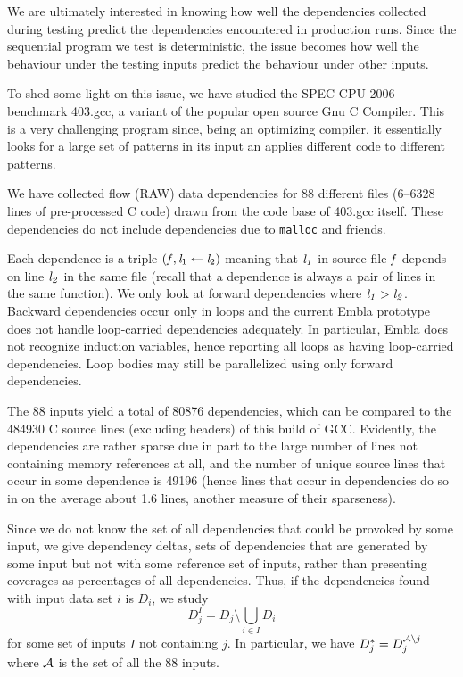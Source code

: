 \documentclass[times, 10pt,twocolumn]{article}
\begin{document}
We are ultimately interested in knowing how well the dependencies
collected during testing predict the dependencies encountered in
production runs.  Since the sequential program we test is
deterministic, the issue becomes how well the behaviour under the
testing inputs predict the behaviour under other inputs.

To shed some light on this issue, we have studied the SPEC CPU 2006
benchmark 403.gcc, a variant of the popular open source Gnu C
Compiler. This is a very challenging program since, being an
optimizing compiler, it essentially looks for a large set of patterns
in its input an applies different code to different patterns.

We have collected flow (RAW) data dependencies for 88 different files
(6--6328 lines of pre-processed C code) drawn from the code base of
403.gcc itself. These dependencies do not include dependencies due to
{\tt malloc} and friends.

Each dependence is a triple $({\it f}, {\it l}_1 \leftarrow {\it l}_2)$
meaning that $\it l_1$ in source file $\it f$ depends on line
$\it l_2$ in the same file (recall that a dependence is always a
pair of lines in the same function). We only look at forward dependencies where $\it l_1 >
l_2$. Backward dependencies occur only in loops and the current
Embla prototype does not handle loop-carried dependencies adequately.
In particular, Embla does not recognize induction variables, hence
reporting all loops as having loop-carried dependencies. Loop bodies 
may still be parallelized using only forward dependencies.

The 88 inputs yield a total of 80876 dependencies, which
can be compared to the 484930 C source lines (excluding headers) of
this build of GCC. Evidently, the dependencies are rather sparse due
in part to the large number of lines not containing memory references at all,
and the number of unique source lines that occur in some dependence is
49196 (hence lines that occur in dependencies do so in on the average
about 1.6 lines, another measure of their sparseness).

Since we do not know the set of all dependencies that could be
provoked by some input, we give dependency deltas, sets of
dependencies that are generated by some input but not with some
reference set of inputs, rather than presenting coverages as
percentages of all dependencies. Thus, if the dependencies found with input data set $i$ is
$D_i$, we study \[D_j^I = D_j \setminus \bigcup_{i \in I} D_i\] for
some set of inputs $I$ not containing $j$. In particular, we have
$D_j^\ast = D_j^{{\cal A} \setminus j}$ where $\cal A$ is the set of
all the 88 inputs.
\end{document}
